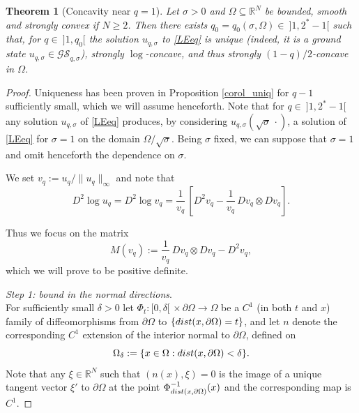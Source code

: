 \documentclass[12pt]{amsart}
\numberwithin{equation}{section}
\newtheorem{theorem}{Theorem}[section]
\theoremstyle{plain}
\theoremstyle{plain}
\theoremstyle{plain}
\theoremstyle{definition}
\newcommand{\R}{{\mathbb R}}
\renewcommand{\ge}{\geqslant}
\begin{document}
\begin{theorem}[Concavity near $q=1$]
\label{thm_concav_gs}
Let $\sigma>0$ and $\Omega\subseteq \R^N$ be bounded, smooth and strongly convex if $N\ge 2$. 
Then there exists $q_0=q_0(\sigma, \Omega) \in\ ]1, 2^*-1[$ such that, for $q \in\ ]1, q_0[$ 
the solution $u_{q, \sigma}$ to \eqref{LEeq} is unique (indeed, it is a ground state $u_{q, \sigma} \in \mathcal{GS}_{q, \sigma}$), strongly $\log$-concave, and thus strongly $(1-q)/2$-concave in $\Omega$.
\end{theorem}

\begin{proof}
Uniqueness has been proven in Proposition \ref{corol_uniq} for $q-1$ sufficiently small, which we will assume henceforth. 
Note that for $q\in\ ]1, 2^*-1[$ any solution $u_{q, \sigma}$ of \eqref{LEeq} produces, by considering $u_{q, \sigma}(\sqrt{\sigma}\, \cdot)$, a solution of \eqref{LEeq} for $\sigma=1$ on the domain $\Omega/\sqrt{\sigma}$. 
Being $\sigma$ fixed, we can suppose that $\sigma=1$ and omit henceforth the dependence on $\sigma$. 
 
We set $v_q:=u_q/\|u_q\|_\infty$ and note that 
 \[
 D^2\log u_q= D^2\log v_q=\frac{ 1}{v_q}\,\left[ D^2v_q-\frac{1}{v_q}\, Dv_q\otimes Dv_q\right].
 \]

 Thus we focus on the matrix 
\begin{equation}\label{eq_def_Mq}
 M(v_q):= 
 \frac{1}{v_q}\, Dv_q\otimes Dv_q -D^2v_q,
\end{equation}
which we will prove to be positive definite.

\smallskip
 {\em Step 1: bound in the normal directions}.\ \\
For sufficiently small $\delta>0$ let $\Phi_t:[0, \delta[\,\times \partial\Omega\to \Omega$ be a $C^1$ (in both $t$ and $x$) family of diffeomorphisms from $\partial\Omega$ to $\{{\rm dist}(x, \partial\Omega)=t\}$, and let $n$ denote the corresponding $C^1$ extension of the interior normal to $\partial\Omega$, defined on 
\[
\Omega_\delta :=\{x\in \Omega:{\rm dist}(x, \partial\Omega)<\delta\}.
\]
 Note that any $\xi\in \R^N$ such that $(n(x), \xi)=0$ is the image of a unique tangent vector $\xi'$ to $\partial\Omega$ at the point $\Phi^{-1}_{{\rm dist}(x, \partial\Omega)}(x)$ and the corresponding map is $C^1$. 


\end{proof}
\end{document}

